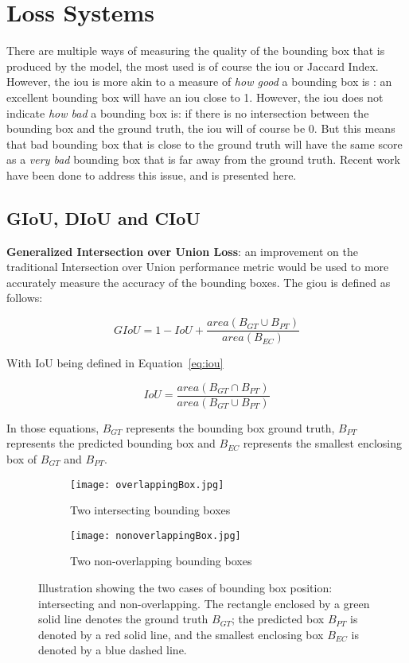 \section{Loss Systems}
There are multiple ways of measuring the quality of the bounding box that is produced by the model, the most used is of course the \gls{iou} or Jaccard Index. However, the \gls{iou} is more akin to a measure of \textit{how good} a bounding box is : an excellent bounding box will have an \gls{iou} close to 1. However, the \gls{iou} does not indicate \textit{how bad} a bounding box is: if there is no intersection between the bounding box and the ground truth, the \gls{iou} will of course be 0. But this means that bad bounding box that is close to the ground truth will have the same score as a \textit{very bad} bounding box that is far away from the ground truth. Recent work have been done to address this issue, and is presented here.

\subsection{GIoU, DIoU and CIoU}
\textbf{Generalized Intersection over Union Loss}: an improvement on the traditional Intersection over Union performance metric would be used to more accurately measure the accuracy of the bounding boxes. The \gls{giou} is defined as follows:

\begin{equation}
	GIoU = 1 -  IoU + \frac{area(B_{GT} \cup B_{PT})}{area(B_{EC})}
\label{eq:GIoU}
\end{equation}

With IoU being defined in Equation~\ref{eq:iou}

\begin{equation}\label{eq:iou}
	IoU = \frac{area(B_{GT} \cap B_{PT})}{area(B_{GT} \cup B_{PT})}
\end{equation}

In those equations, $B_{GT}$ represents the bounding box ground truth, $B_{PT}$ represents the predicted bounding box and $B_{EC}$ represents the smallest enclosing box of $B_{GT}$ and $B_{PT}$.

\begin{figure}[h!]
\begin{subfigure}{.5\textwidth}
  \centering
  \texttt{[image: overlappingBox.jpg]}  
  \caption{Two intersecting bounding boxes}
  \label{fig:sub-first}
\end{subfigure}
\begin{subfigure}{.5\textwidth}
  \centering
  \texttt{[image: nonoverlappingBox.jpg]}  
  \caption{Two non-overlapping bounding boxes}
  \label{fig:sub-second}
\end{subfigure}
	\caption[Bounding boxes overlap cases]{Illustration showing the two cases of bounding box position: intersecting and non-overlapping. The rectangle enclosed by a green solid line denotes the ground truth $B_{GT}$; the predicted box $B_{PT}$ is denoted by a red solid line, and the smallest enclosing box $B_{EC}$ is denoted by a blue dashed line.}
\label{fig:giou}
\end{figure}


